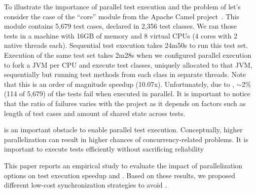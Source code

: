 To illustrate the importance of parallel test execution and the
problem of \pef{} let's consider the case of the ``core'' module from
the Apache Camel project~\cite{apache-camel-web}.  This module
contains 5,679 test cases, declared in 2,356 test classes.  We ran
those tests in a machine with 16GB of memory and 8 virtual CPUs (4
cores with 2 native threads each).  Sequential test execution takes
24m50s to run this test set.  Execution of the same test set takes
2m28s when we configured parallel execution to fork a JVM per CPU and
execute test classes, uniquely allocated to that JVM, sequentially but
running test methods from each class in separate threads.  Note that
this is an order of magnitude speedup (10.07x).
Unfortunately, due to \pef{}, $\sim$2\% (114 of 5,679) of the tests
fail when executed in parallel.  It is important to notice that the
ratio of failures varies with the project as it depends on factors
such as length of test cases and amount of shared state across tests.

\pef{} is an important obstacle to enable parallel test execution.
Conceptually, higher parallelization can result in higher chances of
concurrency-related problems.  It is important to execute tests
efficiently without sacrificing reliability

This paper reports an empirical study to evaluate the impact of
parallelization options on test execution speedup and \pef{}. Based on
these results, we proposed different low-cost synchronization
strategies to avoid \pef{}.

